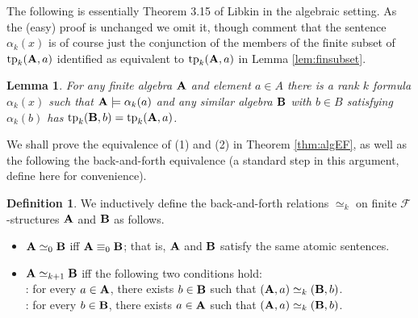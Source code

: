 \documentclass[reqno]{amsart}
\theoremstyle{plain}
\newtheorem{lem}[thm]{Lemma}
\theoremstyle{definition}
\newtheorem{defn}[thm]{Definition}
\newcommand{\tp}{\operatorname{tp}}
\begin{document}
The following is essentially Theorem 3.15 of Libkin \cite{lib} in the algebraic setting.  As the (easy) proof is unchanged we omit it, though comment that the sentence $\alpha_k(x)$ is of course just the conjunction of the members of the finite subset of $\tp_k({\bf A},a)$ identified as equivalent to $\tp_k({\bf A},a)$ in Lemma \ref{lem:finsubset}.
\begin{lem}\label{lem:type}
For any finite algebra ${\bf A}$ and element $a\in A$ there is a rank $k$ formula $\alpha_k(x)$ such that ${\bf A}\models \alpha_k(a)$ and any similar algebra ${\bf B}$ with $b\in B$ satisfying $\alpha_k(b)$ has $\tp_k({\bf B},b)=\tp_k({\bf A},a)$.
\end{lem}

We shall prove the equivalence of (1) and (2) in  Theorem \ref{thm:algEF}, as well as the following the back-and-forth equivalence (a standard step in this argument, define here for convenience).
\begin{defn}\label{defn:backNforth}
We inductively define the back-and-forth relations $\simeq_k$ on finite $\mathcal{F}$-structures ${\bf A}$ and ${\bf B}$ as follows.
\begin{itemize}
\item ${\bf A}\simeq_0{\bf B}$ iff ${\bf A}\equiv_0{\bf B}$; that is, ${\bf A}$ and ${\bf B}$ satisfy the same atomic sentences.
\item ${\bf A}\simeq_{k+1}{\bf B}$ iff the following two conditions hold:\hfill\\
: for every $a\in{\bf  A}$, there exists $b\in{\bf B}$ such that $({\bf A}, a)\simeq_k({\bf B},b)$.\\
: for every $b\in{\bf B}$, there exists $a\in{\bf A}$ such that $({\bf A}, a)\simeq_k({\bf B},b)$.
\end{itemize}
\end{defn}
\end{document}
